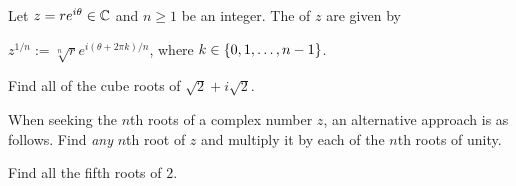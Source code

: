 \documentclass[11pt,fleqn,dvipsnames,usenames]{article}
\begin{document}
%
\begin{definition*}
Let $z = re^{i\theta}\in \mathbb{C}$ and $n\geq 1$ be an integer. The  of $z$ are given by
\begin{center}
$z^{1/n} := \sqrt[n]{r}e^{i(\theta + 2\pi k)/n}$, where $k\in\left\{0, 1, \ldots, n -1\right\}$.
\end{center}
\end{definition*}
%
\begin{example*}
Find all of the cube roots of $\sqrt{2} + i\sqrt{2}$.
\end{example*}
%
\begin{solution}
\vspace{6cm}
\end{solution}
%
\begin{remark}
When seeking the $n$th roots of a complex number $z$, an alternative approach is as follows.  Find \emph{any} $n$th root of $z$ and multiply it by each of the $n$th roots of unity.
\end{remark}
%
\begin{example*}
Find all the fifth roots of $2$.
\end{example*}
%
\begin{solution}
\end{solution}
\end{document}
